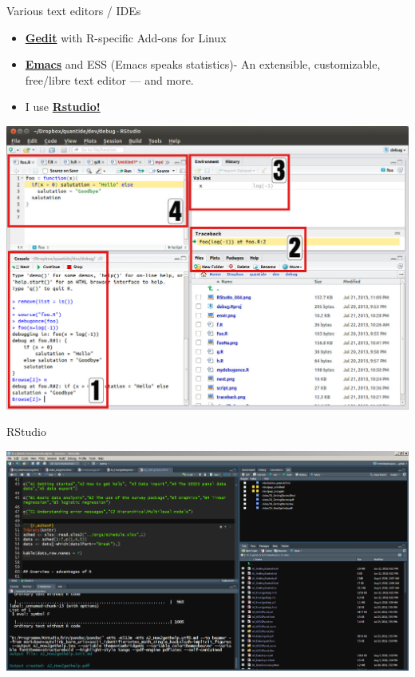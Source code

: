 \documentclass[ignorenonframetext,]{beamer}
\begin{document}
\begin{frame}{Various text editors / IDEs}

\begin{itemize}
\item
  \href{https://projects.gnome.org/gedit/}{\textbf{Gedit}} with
  R-specific Add-ons for Linux
\item
  \href{http://www.gnu.org/software/emacs/}{\textbf{Emacs}} and ESS
  (Emacs speaks statistics)- An extensible, customizable, free/libre
  text editor --- and more.
\item
  I use \href{https://www.rstudio.com/}{\textbf{Rstudio!}}
\end{itemize}

\includegraphics{figure/0_overall.jpg}

\end{frame}

\begin{frame}{RStudio}

\includegraphics{figure/RstudioExample.PNG}

\end{frame}
\end{document}
